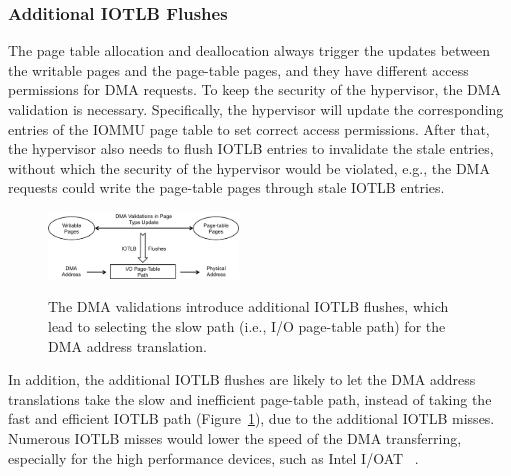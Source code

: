 \subsubsection{Additional IOTLB Flushes}
The page table allocation and deallocation always trigger the updates between the writable pages and the page-table pages, and they have different access permissions for DMA requests.
To keep the security of the hypervisor, the DMA validation is necessary.
Specifically, the hypervisor will update the corresponding entries of the IOMMU page table to set correct access permissions.
After that, the hypervisor also needs to flush IOTLB entries to invalidate the stale entries, without which the security of the hypervisor would be violated, e.g., the DMA requests could write the page-table pages through stale IOTLB entries.

\begin{figure}[ht]
\centering
\includegraphics[width=0.45\textwidth]{image/background/problem-illustration.png} \\
\caption{The DMA validations introduce additional IOTLB flushes, which lead to selecting the slow path  (i.e., I/O page-table path) for the DMA address translation.}
\label{fig:pro-ill}
\end{figure}


In addition, the additional IOTLB flushes are likely to let the DMA address
translations take the slow and inefficient page-table path,
instead of taking the fast and efficient IOTLB path (Figure~\ref{fig:pro-ill}), due to the additional IOTLB misses.
Numerous IOTLB misses would lower the speed of the DMA transferring, especially for the high performance devices, such as Intel I/OAT ~\cite{lauritzenintel}.




